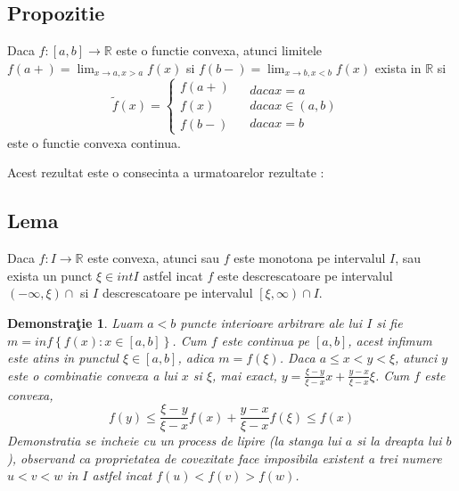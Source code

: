\documentclass[a4paper,12pt,oneside]{report}
\newtheorem{demonstration}{Demonstra\c tie}
\begin{document}
\subsection{Propozitie}
Daca \(f: \left [ a, b \right ]\rightarrow \mathbb{R}\) este o functie convexa, atunci limitele \(f\left ( a+ \right ) = \lim_{x\rightarrow a, x> a}f\left ( x \right )\)  si \(f\left ( b- \right ) = \lim_{x\rightarrow b, x< b}f\left ( x \right )\) exista in \(\mathbb{R}\) si
\begin{displaymath}
  \tilde{f}\left ( x \right )= \left\{\begin{matrix}
f\left ( a+ \right ) & \\ 
 f\left ( x \right )& \\ 
 f\left ( b- \right )& 
\end{matrix} \begin{matrix}
daca x= a & \\ 
daca x\in \left ( a,b \right ) & \\ 
 daca x= b& 
\end{matrix}\right.
\end{displaymath}
 este o functie convexa continua. 

	Acest rezultat este o consecinta a urmatoarelor rezultate :


\subsection{Lema}

Daca \(f: I \rightarrow \mathbb{R}\) este convexa, atunci sau \(f\) este monotona pe intervalul \(I\), sau exista un punct \(\xi \in int I\) astfel incat \(f\) este descrescatoare pe intervalul \(\left ( -\infty , \xi  \right )\cap\) si \(I\) descrescatoare pe intervalul \(\left[\xi , \infty  \right )\cap I\).

\begin{demonstration}
Luam \(a < b\) puncte interioare arbitrare ale lui \(I\) si fie \\ \(m = inf\left \{ f\left ( x \right )  : x\in \left [ a,b \right ]\right \}\). Cum \(f\) este continua pe \(\left [ a,b \right ]\), acest infimum este atins in punctul \(\xi \in \left [ a,b \right ]\), adica \(m = f\left ( \xi  \right )\).
Daca \(a \leq x <  y< \xi\), atunci \(y\) este o combinatie convexa a lui \(x\) si \(\xi\), mai exact, \(y = \frac{\xi -y}{\xi -x}x + \frac{y - x}{\xi -x}\xi\). Cum \(f\) este convexa, 
\begin{displaymath}
  f\left ( y \right )\leq \frac{\xi -y}{\xi -x}f\left ( x \right )+ \frac{y-x}{\xi -x}f\left ( \xi  \right )\leq f\left ( x \right ) 
\end{displaymath}
Demonstratia se incheie cu un process de lipire (la stanga lui \(a\) si la dreapta lui \(b\)), observand ca proprietatea de covexitate face imposibila existent a trei numere \(u < v < w\) in \(I\) astfel incat \(f\left ( u \right ) < f\left ( v \right )> f\left ( w \right )\). 
\end{demonstration}
\end{document}
